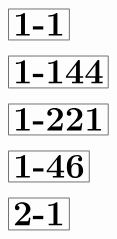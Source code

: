 \documentclass[a4paper, 10pt]{article}
\begin{document}
\thispagestyle{empty}
\begin{minipage}[t]{0.15\textwidth}
                \vspace*{-3.5cm}
        \hspace*{1.25cm}
        $\boxed{\textbf{\Huge1-1}}$
\end{minipage}
\begin{minipage}[t]{0.85\textwidth}
    
\end{minipage}

\begin{minipage}[t]{0.15\textwidth}
                \vspace*{-3.5cm}
        \hspace*{0.25cm}
        $\boxed{\textbf{\Huge1-144}}$
\end{minipage}
\begin{minipage}[t]{0.85\textwidth}
    
\end{minipage}

\begin{minipage}[t]{0.15\textwidth}
                \vspace*{-3.5cm}
        \hspace*{0.25cm}
        $\boxed{\textbf{\Huge1-221}}$
\end{minipage}
\begin{minipage}[t]{0.85\textwidth}
    
\end{minipage}

\begin{minipage}[t]{0.15\textwidth}
                \vspace*{-3.5cm}
        \hspace*{0.75cm}
        $\boxed{\textbf{\Huge1-46}}$
\end{minipage}
\begin{minipage}[t]{0.85\textwidth}
    
\end{minipage}

\begin{minipage}[t]{0.15\textwidth}
                \vspace*{-3.5cm}
        \hspace*{1.25cm}
        $\boxed{\textbf{\Huge2-1}}$
\end{minipage}
\begin{minipage}[t]{0.85\textwidth}
    
\end{minipage}
\end{document}
